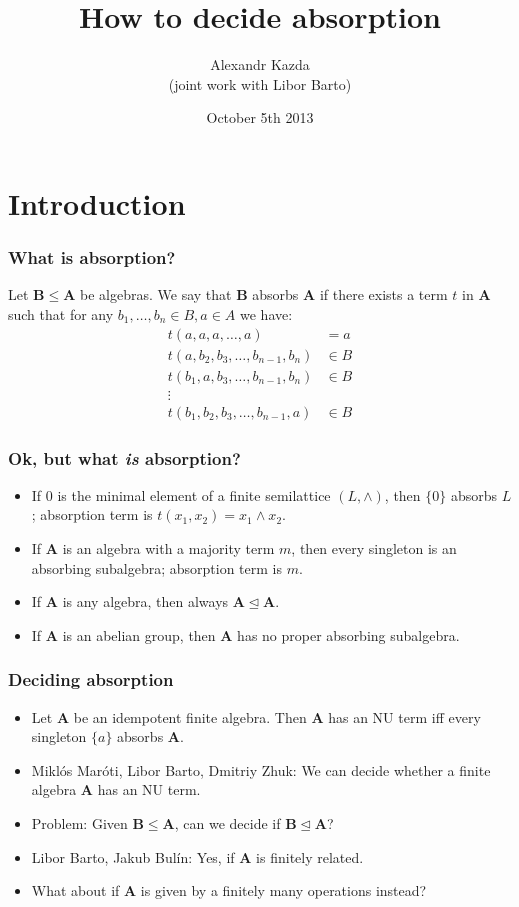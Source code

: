 \documentclass[violet,handout]{beamer}
\title{How to decide absorption}
\author[AK \& LB]{Alexandr Kazda\\ (joint work with Libor Barto)}
\institute[Vanderbilt] {Department of Mathematics\\ Vanderbilt
University}
\date{October 5th 2013}
\def\algA{{\mathbf A}}
\def\algB{{\mathbf B}}
\let\meet\wedge
\def\absorbs{\operatorname{\trianglelefteq}}
\begin{document}
%
\begin{frame}
   \titlepage
\end{frame}


\section{Introduction}
\begin{frame}
\frametitle{What is absorption?}
\pause
\begin{definition} 
  Let $\algB\leq \algA$ be algebras. We say that $\algB$ \alert{absorbs} $\algA$ if there exists a
  term $t$ in $\algA$ such that for any $b_1,\dots,b_n\in B, a\in A$ we have:
  \begin{align*}
    t(a,a,a,\dots,a)&=a\\
    t(a,b_2,b_3,\dots,b_{n-1},b_n)&\in B\\
    t(b_1,a,b_3,\dots,b_{n-1},b_n)&\in B\\
    \vdots\\
    t(b_1,b_2,b_3,\dots,b_{n-1},a)&\in B
  \end{align*}
\end{definition}
\end{frame}
\begin{frame}
  \frametitle{Ok, but what \emph{is} absorption?}
\begin{itemize}
  \pause\item If $0$ is the minimal element of a finite semilattice
    $(L,\meet)$, then
    $\{0\}$ absorbs $L$; absorption term is $t(x_1,x_2)=x_1\meet x_2$.
\pause\item If $\algA$ is an algebra with a majority term $m$, then every singleton is an
  absorbing subalgebra; absorption term is $m$.
\pause\item If $\algA$ is any algebra, then always $\algA\absorbs \algA$.
\pause\item If $\algA$ is an abelian group, then $\algA$ has no proper absorbing
  subalgebra.
\end{itemize}
\end{frame}
\begin{frame}
  \frametitle{Deciding absorption}
  \begin{itemize}
    \pause\item Let $\algA$ be an idempotent finite algebra. Then $\algA$ has an NU term iff
      every singleton $\{a\}$ absorbs $\algA$.
     \pause\item Miklós Maróti, Libor Barto, Dmitriy Zhuk: We can decide whether a finite 
       algebra $\algA$ has an NU term.
    \pause\item Problem: Given $\algB\leq \algA$, can we decide if $\algB\absorbs \algA$?
    \pause\item Libor Barto, Jakub Bulín: Yes, if $\algA$ is finitely related.
    \pause\item What about if $\algA$ is given by a finitely many
      operations instead?
  \end{itemize}
    \end{frame}
\end{document}
